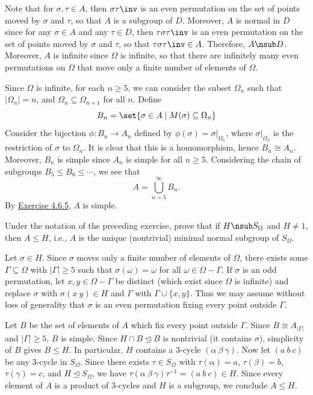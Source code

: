 \begin{sol}
	Note that for $\sigma, \tau \in A$, then $\sigma\tau\inv$ is an even permutation on the set of points moved by $\sigma$ and $\tau$, so that $A$ is a subgroup of $D$. Moreover, $A$ is normal in $D$ since for any $\sigma \in A$ and any $\tau \in D$, then $\tau\sigma\tau\inv$ is an even permutation on the set of points moved by $\sigma$ and $\tau$, so that $\tau\sigma\tau\inv \in A$. Therefore, $A \nsub D$. Moreover, $A$ is infinite since $\Omega$ is infinite, so that there are infinitely many even permutations on $\Omega$ that move only a finite number of elements of $\Omega$.

	Since $\Omega$ is infinite, for each $n \geq 5$, we can consider the subset $\Omega_n$ such that $|\Omega_n| = n$, and $\Omega_n \subseteq \Omega_{n + 1}$ for all $n$. Define
	\[B_n = \set{\sigma \in A \mid M(\sigma) \subseteq \Omega_n}\]
	Consider the bijection $\phi : B_n \to A_n$ defined by $\phi(\sigma) = \sigma|_{\Omega_n}$, where $\sigma|_{\Omega_n}$ is the restriction of $\sigma$ to $\Omega_n$. It is clear that this is a homomorphism, hence $B_n \cong A_n$. Moreover, $B_n$ is simple since $A_n$ is simple for all $n \geq 5$. Considering the chain of subgroups $B_5 \leq B_6 \leq \cdots$, we see that
	\[A = \bigcup_{n = 5}^\infty B_n.\]
	By \hyperref[ex4.6.5]{Exercise 4.6.5}, $A$ is simple.
\end{sol}

\begin{exercise}\label{ex4.6.7}
	Under the notation of the preceding exercise, prove that if $H \nsub S_\Omega$ and $H \neq 1$, then $A \leq H$, i.e., $A$ is the unique (nontrivial) minimal normal subgroup of $S_\Omega$.
\end{exercise}

\begin{sol}
	Let $\sigma \in H$. Since $\sigma$ moves only a finite number of elements of $\Omega$, there exists some $\Gamma \subseteq \Omega$ with $|\Gamma| \geq 5$ such that $\sigma(\omega) = \omega$ for all $\omega \in \Omega - \Gamma$. If $\sigma$ is an odd permutation, let $x, y \in \Omega - \Gamma$ be distinct (which exist since $\Omega$ is infinite) and replace $\sigma$ with $\sigma(x\ y) \in H$ and $\Gamma$ with $\Gamma \cup \{x, y\}$. Thus we may assume without loss of generality that $\sigma$ is an even permutation fixing every point outside $\Gamma$. 

	Let $B$ be the set of elements of $A$ which fix every point outside $\Gamma$. Since $B \cong A_{|\Gamma|}$ and $|\Gamma| \geq 5$, $B$ is simple. Since $H \cap B \trianglelefteq B$ is nontrivial (it contains $\sigma$), simplicity of $B$ gives $B \leq H$. In particular, $H$ contains a 3-cycle $(\alpha\ \beta\ \gamma)$. Now let $(a\ b\ c)$ be any 3-cycle in $S_\Omega$. Since there exists $\tau \in S_\Omega$ with $\tau(\alpha) = a$, $\tau(\beta) = b$, $\tau(\gamma) = c$, and $H \trianglelefteq S_\Omega$, we have $\tau(\alpha\ \beta\ \gamma)\tau^{-1} = (a\ b\ c) \in H$. Since every element of $A$ is a product of 3-cycles and $H$ is a subgroup, we conclude $A \leq H$.
\end{sol}

